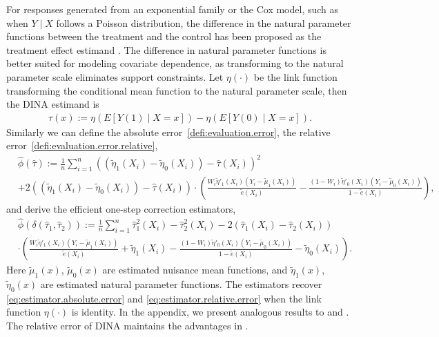 \documentclass{article}
\theoremstyle{plain}
\theoremstyle{definition}
\theoremstyle{plain}
\begin{document}
For responses generated from an exponential family or the Cox model, such as when $ Y \mid X $ follows a Poisson distribution, the difference in the natural parameter functions between the treatment and the control has been proposed as the treatment effect estimand \parencite{gao2022DINA}.
The difference in natural parameter functions is better suited for modeling covariate dependence, as transforming to the natural parameter scale eliminates support constraints.
Let $\eta(\cdot)$ be the link function transforming the conditional mean function to the natural parameter scale, then the DINA estimand is 
\begin{align*}
    \tau(x) := \eta(E[Y(1) \mid X = x]) - \eta(E[Y(0) \mid X = x]).
\end{align*} 
Similarly we can define the absolute error~\eqref{defi:evaluation.error}, the relative error~\eqref{defi:evaluation.error.relative}, 
\begin{align*}
    &\hat{\phi}(\hat{\tau})
    := \frac{1}{n} \sum_{i=1}^n \left((\tilde{\eta}_1(X_i) - \tilde{\eta}_0(X_i)) - \hat{\tau}(X_i)\right)^2  \\
    &+ 2\left((\tilde{\eta}_1(X_i) - \tilde{\eta}_0(X_i)) - \hat{\tau}(X_i)\right) \cdot \left(\frac{W_i\tilde{\eta}'_1(X_i)(Y_i - \tilde{\mu}_1(X_i))}{\tilde{e}(X_i)} - \frac{(1-W_i)\tilde{\eta}'_0(X_i)(Y_i - \tilde{\mu}_0(X_i))}{1-\tilde{e}(X_i)} \right),
\end{align*}
and derive the efficient one-step correction estimators, \begin{align*}    
    &\hat{\phi}(\delta(\hat{\tau}_1, \hat{\tau}_2))
    := \frac{1}{n} \sum_{i=1}^n \hat{\tau}_1^2(X_i) - \hat{\tau}_2^2(X_i) - 2\left(\hat{\tau}_1(X_i) - \hat{\tau}_2(X_i)\right)\\
    & \cdot \left(\frac{W_i \tilde{\eta}'_1(X_i) (Y_i - \tilde{\mu}_1(X_i))}{\tilde{e}(X_i)} + \tilde{\eta}_1(X_i)- \frac{(1-W_i)\tilde{\eta}'_0(X_i)(Y_i - \tilde{\mu}_0(X_i))}{1-\tilde{e}(X_i)} - \tilde{\eta}_0(X_i)\right).
\end{align*}
Here $\tilde{\mu}_1(x)$, $\tilde{\mu}_0(x)$ are estimated nuisance mean functions, and $\tilde{\eta}_1(x)$, $\tilde{\eta}_0(x)$ are estimated natural parameter functions.
The estimators recover \eqref{eq:estimator.absolute.error} and \eqref{eq:estimator.relative.error} when the link function $\eta(\cdot)$ is identity. 
In the appendix, we present analogous results to  and .
The relative error of DINA maintains the advantages in .
\end{document}
